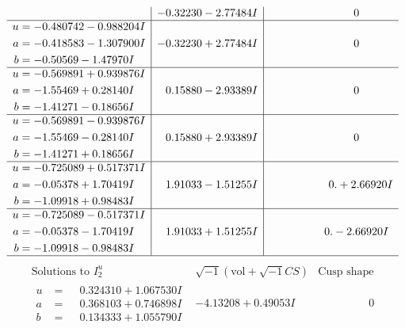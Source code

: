 \documentclass[1p]{elsarticle_modified}
\theoremstyle{definition}
\newcommand{\I}{\sqrt{-1}}
\begin{document}
$$\begin{array}{c|c|c}
 & -0.32230 - 2.77484 I & \phantom{-0.000000 } 0 \\ \hline\begin{aligned}
u &= -0.480742 - 0.988204 I \\
a &= -0.418583 - 1.307900 I \\
b &= -0.50569 - 1.47970 I\end{aligned}
 & -0.32230 + 2.77484 I & \phantom{-0.000000 } 0 \\ \hline\begin{aligned}
u &= -0.569891 + 0.939876 I \\
a &= -1.55469 + 0.28140 I \\
b &= -1.41271 - 0.18656 I\end{aligned}
 & \phantom{-}0.15880 - 2.93389 I & \phantom{-0.000000 } 0 \\ \hline\begin{aligned}
u &= -0.569891 - 0.939876 I \\
a &= -1.55469 - 0.28140 I \\
b &= -1.41271 + 0.18656 I\end{aligned}
 & \phantom{-}0.15880 + 2.93389 I & \phantom{-0.000000 } 0 \\ \hline\begin{aligned}
u &= -0.725089 + 0.517371 I \\
a &= -0.05378 + 1.70419 I \\
b &= -1.09918 + 0.98483 I\end{aligned}
 & \phantom{-}1.91033 - 1.51255 I & \phantom{-0.000000 -}0. + 2.66920 I \\ \hline\begin{aligned}
u &= -0.725089 - 0.517371 I \\
a &= -0.05378 - 1.70419 I \\
b &= -1.09918 - 0.98483 I\end{aligned}
 & \phantom{-}1.91033 + 1.51255 I & \phantom{-0.000000 } 0. - 2.66920 I\\
 \hline 
 \end{array}$$\newpage$$\begin{array}{c|c|c}  
\text{Solutions to }I^u_{2}& \I (\text{vol} + \sqrt{-1}CS) & \text{Cusp shape}\\
 \hline 
\begin{aligned}
u &= \phantom{-}0.324310 + 1.067530 I \\
a &= \phantom{-}0.368103 + 0.746898 I \\
b &= \phantom{-}0.134333 + 1.055790 I\end{aligned}
 & -4.13208 + 0.49053 I & \phantom{-0.000000 } 0 \\ \hline\begin{aligned}

\end{aligned}
\end{array}$$
\end{document}
